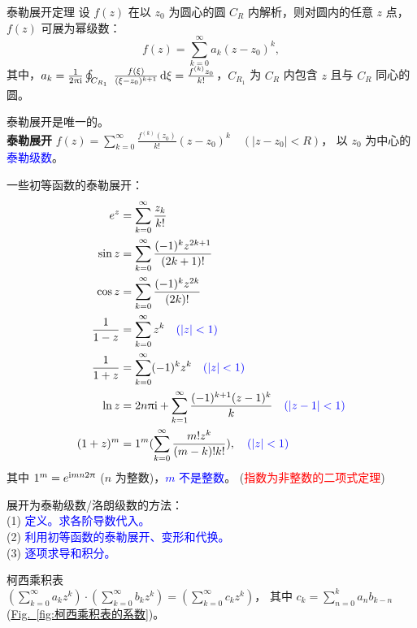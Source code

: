 \documentclass[12pt, a4paper, oneside, UTF8]{ctexbook}
\begin{document}
\begin{them}{泰勒展开定理}{}
    设 $f(z)$ 在以 $z_0$ 为圆心的圆 $C_R$ 内解析，则对圆内的任意 $z$ 点，$f(z)$ 可展为幂级数：
\[f(z) = \sum_{k=0}^{\infty} a_k (z-z_0)^k,\]
    其中，$a_k = \frac{1}{2\uppi\mathrm{i}} \oint_{C_{R_1}}\;\frac{f(\xi)}{(\xi-z_0)^{k+1}}\mathop{}\!\mathrm{d} \xi 
    = \frac{f^{(k)} z_0}{k!}$，$C_{R_1}$ 为 $C_R$ 内包含 $z$ 且与 $C_R$ 同心的圆。
\end{them}
\noindent {} 泰勒展开是唯一的。\\
\textbf{泰勒展开} $f(z) = \sum_{k=0}^{\infty} \frac{f^{(k)} (z_0)}{k!} 
(z-z_0)^k \quad (\left\lvert z-z_0 \right\rvert < R)$，
以 $z_0$ 为中心的 \textcolor{blue}{泰勒级数}。

\noindent 一些初等函数的泰勒展开：
\begin{align*}
    e^z & = \sum_{k=0}^{\infty} \frac{z_k}{k!}\\
    \sin z & = \sum_{k=0}^{\infty} \frac{(-1)^k z^{2k+1}}{(2k+1)!}\\
    \cos z & = \sum_{k=0}^{\infty} \frac{(-1)^k z^{2k}}{(2k)!}\\
    \frac{1}{1-z} & = \sum_{k=0}^{\infty} z^k \quad \textcolor{blue}{(\left\lvert z \right\rvert < 1)}\\
    \frac{1}{1+z} & = \sum_{k=0}^{\infty} (-1)^k z^k \quad \textcolor{blue}{(\left\lvert z \right\rvert < 1)}\\
    \ln z & = 2n\uppi\mathrm{i} + \sum_{k=1}^{\infty} \frac{(-1)^{k+1} (z-1)^k}{k} \quad \textcolor{blue}{(\left\lvert z-1 \right\rvert < 1)}\\
    (1+z)^m & = 1^m (\sum_{k=0}^{\infty} \frac{m! z^k}{(m-k)!k!}), \quad \textcolor{blue}{(\left\lvert z \right\rvert < 1)}
\end{align*}
其中 $1^m=e^{\mathrm{i} mn 2\uppi}$ ($n$ 为整数)，\textcolor{blue}{$m$ 不是整数}。
(\textcolor{red}{指数为非整数的二项式定理})

\noindent {} 展开为泰勒级数/洛朗级数的方法：\\
(1) \textcolor{blue}{定义。求各阶导数代入。}\\
(2) \textcolor{blue}{利用初等函数的泰勒展开、变形和代换。}\\
(3) \textcolor{blue}{逐项求导和积分。}

\noindent {} 柯西乘积表\\
$(\sum_{k=0}^{\infty} a_k z^k)\cdot (\sum_{k=0}^{\infty} b_k z^k) = (\sum_{k=0}^{\infty} c_k z^k)$，
其中 $c_k = \sum_{n=0}^{k} a_n b_{k-n}$ (\hyperref[fig:柯西乘积表的系数]{Fig.~\ref{fig:柯西乘积表的系数}})。
\end{document}
